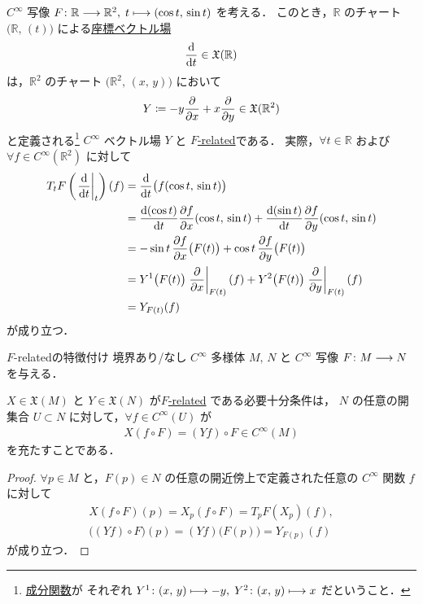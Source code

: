 \documentclass[geometry_main]{subfiles}
\begin{document}
\begin{myexample}[]{}
    $C^\infty$ 写像 $F \colon \mathbb{R} \longrightarrow \mathbb{R}^2,\; t\longmapsto (\cos t,\, \sin t)$ を考える．
    このとき，$\mathbb{R}$ のチャート $\bigl(\mathbb{R},\, (t)\bigr)$ による\hyperref[def:coord-vecf]{座標ベクトル場}
    \begin{align}
        \dv{}{t} \in \mathfrak{X}(\mathbb{R})
    \end{align}
    は，$\mathbb{R}^2$ のチャート $\bigl(\mathbb{R}^2,\, (x,\, y)\bigr)$ において
    \begin{align}
        Y \coloneqq - y \pdv{}{x} + x \pdv{}{y} \in \mathfrak{X} (\mathbb{R}^2)
    \end{align}
    と定義される\footnote{\hyperref[def:vecf]{成分関数}が それぞれ $Y^1 \colon (x,\, y) \longmapsto -y,\; Y^2 \colon (x,\, y) \longmapsto x$ だということ．} $C^\infty$ ベクトル場 $Y$ と \hyperref[def:F-related]{$F$-related}である．
    実際，$\forall t \in \mathbb{R}$ および $\forall f \in C^\infty (\mathbb{R}^2)$ に対して
    \begin{align}
        T_t F\left(\eval{\dv{}{t}}_t\right) (f) &= \dv{}{t}() \bigl( f(\cos t,\, \sin t) \bigr) \\
        &= \dv{(\cos t)}{t} \pdv{f}{x}()(\cos t,\, \sin t) + \dv{(\sin t)}{t} \pdv{f}{y}()(\cos t,\, \sin t) \\
        &= - \sin t \, \pdv{f}{x}()\bigl(F(t)\bigr) + \cos t \, \pdv{f}{y} \bigl(F(t)\bigr) \\
        &= Y^1 \bigl( F(t) \bigr)  \eval{\pdv{}{x}}_{F(t)}(f) + Y^2 \bigl( F(t) \bigr)  \eval{\pdv{}{y}}_{F(t)} (f) \\
        &= Y_{F(t)} (f)
    \end{align}
    が成り立つ．
\end{myexample}


\begin{myprop}[label=prop:F-related]{$F$-relatedの特徴付け}
    境界あり/なし $C^\infty$ 多様体 $M,\, N$ と $C^\infty$ 写像 $F \colon M \longrightarrow N$ を与える．

    $X \in \mathfrak{X}(M)$ と $Y \in \mathfrak{X}(N)$ が\hyperref[def:F-related]{$F$-related} である必要十分条件は，
    $N$ の任意の開集合 $U \subset N$ に対して，$\forall f \in C^\infty (U)$ が
    \begin{align}
        X(f \circ F) = (Y f) \circ F \in C^\infty (M)
    \end{align}
    を充たすことである．
\end{myprop}

\begin{proof}
    $\forall p \in M$ と，$F(p) \in N$ の任意の開近傍上で定義された任意の $C^\infty$ 関数 $f$ に対して
    \begin{align}
        X(f \circ F)(p) = X_p (f \circ F) = T_p F (X_p) (f), \\
        \bigl((Yf) \circ F\bigr)(p) = (Yf) \bigl( F(p) \bigr) = Y_{F(p)} (f)
    \end{align}
    が成り立つ．
\end{proof}
\end{document}
